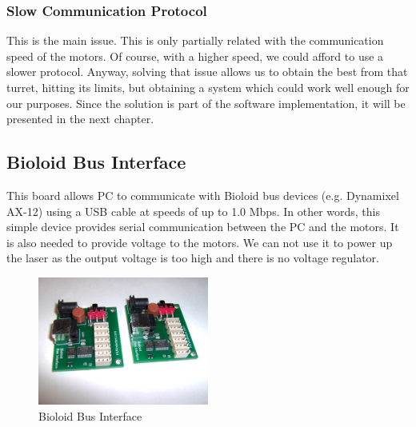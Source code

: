 \subsubsection{Slow Communication Protocol}
This is the main issue. This is only partially related with the communication speed of the motors. Of course, with a higher speed, we could afford to use a slower protocol. Anyway, solving that issue allows us to obtain the best from that turret, hitting its limits, but obtaining a system which could work well enough for our purposes. Since the solution is part of the software implementation, it will be presented in the next chapter.

\subsection{Bioloid Bus Interface}
This board allows PC to communicate with Bioloid bus devices (e.g. Dynamixel AX-12) using a USB cable at speeds of up to 1.0 Mbps. In other words,
this simple device provides serial communication between the PC and the motors. It is also needed to provide voltage to the motors. We can not use it to power up the laser as the output voltage is too high and there is no voltage regulator.
\begin{figure}[h]
	\centering
	\includegraphics[width=0.5\textwidth]{img/busInterface.jpg}%
	\caption{Bioloid Bus Interface}
	\label{fig:busInterface}
\end{figure}
